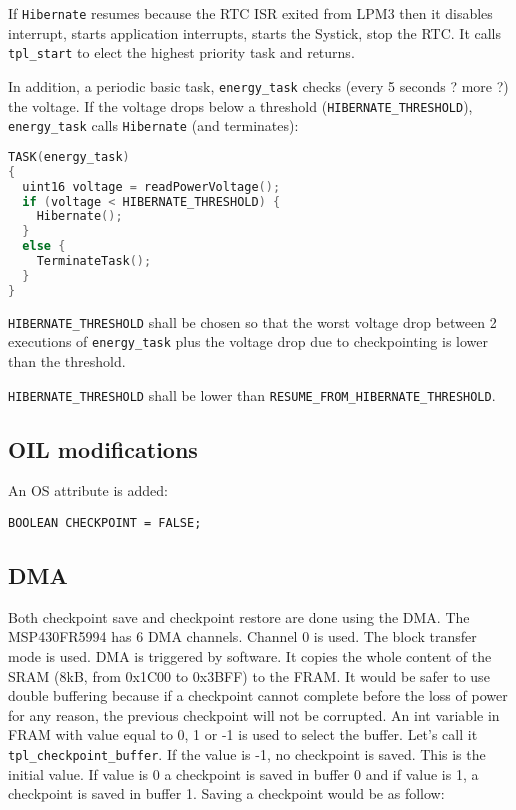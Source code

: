 \documentclass[11pt, oneside]{article}   	%
\begin{document}
If \lstinline{Hibernate} resumes because the RTC ISR exited from LPM3 then it disables interrupt, starts application interrupts, starts the Systick, stop the RTC. It calls \lstinline{tpl_start} to elect the highest priority task and returns.

In addition, a periodic basic task, \lstinline{energy_task} checks (every 5 seconds ? more ?) the voltage. If the voltage drops below a threshold (\lstinline{HIBERNATE_THRESHOLD}), \lstinline{energy_task} calls \lstinline{Hibernate} (and terminates):

\begin{lstlisting}[language=C]
TASK(energy_task)
{
  uint16 voltage = readPowerVoltage();
  if (voltage < HIBERNATE_THRESHOLD) {
    Hibernate();
  }
  else {
    TerminateTask();
  }
}
\end{lstlisting}

\lstinline{HIBERNATE_THRESHOLD} shall be chosen so that the worst voltage drop between 2 executions of \lstinline{energy_task} plus the voltage drop due to checkpointing is lower than the threshold.

\lstinline{HIBERNATE_THRESHOLD} shall be lower than \lstinline{RESUME_FROM_}\-\lstinline{HIBERNATE_THRESHOLD}.

\subsection{OIL modifications}

An OS attribute is added:

\begin{lstlisting}
BOOLEAN CHECKPOINT = FALSE;
\end{lstlisting}

\subsection{DMA}

Both checkpoint save and checkpoint restore are done using the DMA. The MSP430FR5994 has 6 DMA channels. Channel 0 is used. The block transfer mode is used. DMA is triggered by software. It copies the whole content of the SRAM (8kB, from 0x1C00 to 0x3BFF) to the FRAM. It would be safer to use double buffering because if a checkpoint cannot complete before the loss of power for any reason, the previous checkpoint will not be corrupted. An int variable in FRAM with value equal to 0, 1 or -1 is used to select the buffer. Let's call it \lstinline{tpl_checkpoint_buffer}. If the value is -1, no checkpoint is saved. This is the initial value. If value is 0 a checkpoint is saved in buffer 0 and if value is 1, a checkpoint is saved in buffer 1. Saving a checkpoint would be as follow: 
\end{document}
